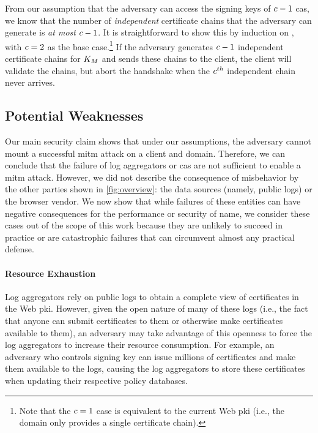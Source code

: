 
From our assumption that the adversary can access the signing keys
of $c - 1$ \acp{ca},
we know that the number of \emph{independent} certificate chains that the adversary can generate
is \emph{at most} $c - 1$. It is straightforward to show this by induction
on \policy, with $c = 2$ as the base case.\footnote{Note that the $c
= 1$ case is equivalent to the current Web \ac{pki} (i.e., the domain only
provides a single certificate chain).} If the adversary generates $c - 1$
independent certificate chains for $K_M$ and sends these chains to
the client, the client will validate the chains, but abort the handshake when
the $c^{th}$ independent chain never arrives.

\subsection{Potential Weaknesses}
\label{sec:analysis:weaknesses}

Our main security claim shows that under our assumptions, the adversary cannot
mount a successful \ac{mitm} attack on a client and domain. Therefore, we can
conclude that the failure of log aggregators or \acp{ca} are not sufficient to
enable a \ac{mitm} attack. However, we did not describe the consequence of
misbehavior by the other parties shown in \autoref{fig:overview}: the data
sources (namely, public logs) or the browser vendor. We now show that while
failures of these entities can have negative consequences for the performance or
security of \ac{name}, we consider these cases out of the scope of this work
because they are unlikely to succeed in practice or are catastrophic failures
that can circumvent almost any practical defense.

\paragraph{Resource Exhaustion}

Log aggregators rely on public logs to obtain a complete view of certificates in
the Web \ac{pki}. However, given the open nature of many of these logs (i.e.,
the fact that anyone can submit certificates to them or otherwise make
certificates available to them), an adversary may take advantage of this
openness to force the log aggregators to increase their resource consumption.
For example, an adversary who controls  signing key can issue millions
of certificates and make them available to the logs, causing the log aggregators
to store these certificates when updating their respective policy databases.

